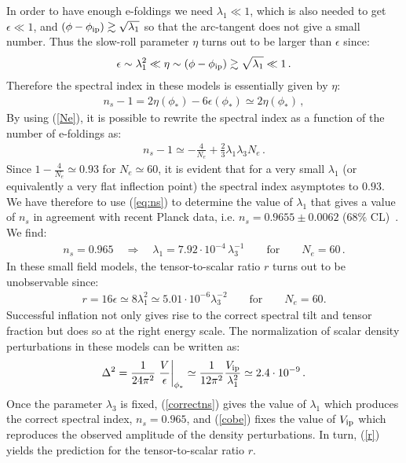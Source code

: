 \documentclass[12pt,a4paper]{book}
\begin{document}
In order to have enough e-foldings we need $\lambda_1\ll 1$, which is also needed to get $\epsilon\ll 1$, and $(\phi - \phi_{\rm ip})\gtrsim \sqrt{\lambda_1}$ so that the arc-tangent does not give a small number. Thus the slow-roll parameter $\eta$ turns out to be larger than $\epsilon$ since:
\begin{align}
\epsilon\sim \lambda_1^2 \ll \eta \sim (\phi - \phi_{\rm ip})\gtrsim \sqrt{\lambda_1}\ll 1\,.
\end{align}
Therefore the spectral index in these models is essentially given by $\eta$:
\begin{align}
n_s - 1 = 2 \eta(\phi_*) - 6 \epsilon(\phi_*) \simeq 2 \eta(\phi_*)\,,
\end{align}
By using (\ref{Ne}), it is possible to rewrite the spectral index as a function of the number of e-foldings as: 
\begin{align}
n_s - 1 \simeq - \frac{4}{N_e} + \frac 23 \lambda_1\lambda_3 N_e\,.
\label{eq:ns}
\end{align}
Since $1 - \frac{4}{N_e} \simeq 0.93$ for $N_e\simeq 60$, it is evident that for a very small $\lambda_1$ (or equivalently a very flat inflection point) the spectral index asymptotes to $0.93$. We have therefore to use (\ref{eq:ns}) to determine the value of $\lambda_1$ that gives a value of $n_s$ in agreement with recent Planck data, i.e. $n_s = 0.9655\pm 0.0062$ ($68\%$ CL)~\cite{Ade:2015lrj}. We find:
\begin{align}
n_s=0.965 \quad\Rightarrow\quad \lambda_1=7.92\cdot 10^{-4}\,\lambda_3^{-1}\qquad\text{for}\qquad N_e=60\,.
\label{correctns}
\end{align}
In these small field models, the tensor-to-scalar ratio $r$ turns out to be unobservable since:
\begin{align}
r= 16 \epsilon \simeq 8\lambda_1^2 \simeq 5.01\cdot 10^{-6} \lambda_3^{-2}\qquad\text{for}\qquad N_e=60.
\label{r}
\end{align}
Successful inflation not only gives rise to the correct spectral tilt and tensor fraction but does so at the right energy scale. The normalization of scalar density perturbations in these models can be written as: 
\begin{align}
\Delta^2 = \frac{1}{24 \pi^2} \left.\frac{V}{\epsilon}\right|_{\phi_*} \simeq \frac{1}{12 \pi^2} \frac{V_{\rm ip}}{\lambda_1^2} \simeq 2.4 \cdot 10^{-9}\,.
\label{cobe}
\end{align}
Once the parameter $\lambda_3$ is fixed, (\ref{correctns}) gives the value of $\lambda_1$ which produces the correct spectral index, $n_s=0.965$, and (\ref{cobe}) fixes the value of $V_{\rm ip}$ which reproduces the observed amplitude of the density perturbations. In turn, (\ref{r}) yields the prediction for the tensor-to-scalar ratio $r$. 
\end{document}
